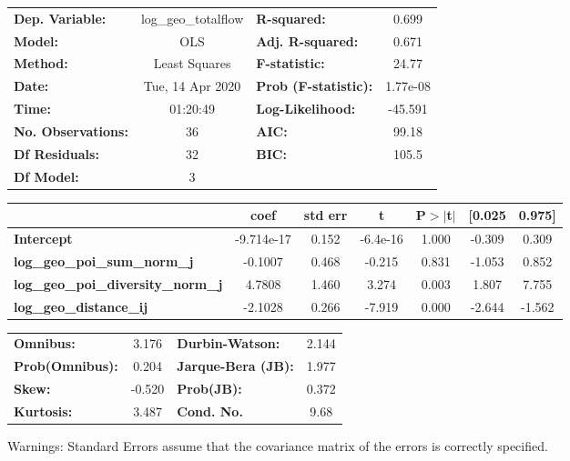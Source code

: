 \begin{center}
\begin{tabular}{lclc}
\toprule
\textbf{Dep. Variable:}                    & log\_geo\_totalflow & \textbf{  R-squared:         } &     0.699   \\
\textbf{Model:}                            &         OLS         & \textbf{  Adj. R-squared:    } &     0.671   \\
\textbf{Method:}                           &    Least Squares    & \textbf{  F-statistic:       } &     24.77   \\
\textbf{Date:}                             &   Tue, 14 Apr 2020  & \textbf{  Prob (F-statistic):} &  1.77e-08   \\
\textbf{Time:}                             &       01:20:49      & \textbf{  Log-Likelihood:    } &   -45.591   \\
\textbf{No. Observations:}                 &            36       & \textbf{  AIC:               } &     99.18   \\
\textbf{Df Residuals:}                     &            32       & \textbf{  BIC:               } &     105.5   \\
\textbf{Df Model:}                         &             3       & \textbf{                     } &             \\
\bottomrule
\end{tabular}
\begin{tabular}{lcccccc}
                                           & \textbf{coef} & \textbf{std err} & \textbf{t} & \textbf{P$> |$t$|$} & \textbf{[0.025} & \textbf{0.975]}  \\
\midrule
\textbf{Intercept}                         &   -9.714e-17  &        0.152     &  -6.4e-16  &         1.000        &       -0.309    &        0.309     \\
\textbf{log\_geo\_poi\_sum\_norm\_j}       &      -0.1007  &        0.468     &    -0.215  &         0.831        &       -1.053    &        0.852     \\
\textbf{log\_geo\_poi\_diversity\_norm\_j} &       4.7808  &        1.460     &     3.274  &         0.003        &        1.807    &        7.755     \\
\textbf{log\_geo\_distance\_ij}            &      -2.1028  &        0.266     &    -7.919  &         0.000        &       -2.644    &       -1.562     \\
\bottomrule
\end{tabular}
\begin{tabular}{lclc}
\textbf{Omnibus:}       &  3.176 & \textbf{  Durbin-Watson:     } &    2.144  \\
\textbf{Prob(Omnibus):} &  0.204 & \textbf{  Jarque-Bera (JB):  } &    1.977  \\
\textbf{Skew:}          & -0.520 & \textbf{  Prob(JB):          } &    0.372  \\
\textbf{Kurtosis:}      &  3.487 & \textbf{  Cond. No.          } &     9.68  \\
\bottomrule
\end{tabular}
\end{center}

Warnings: \newline
 [1] Standard Errors assume that the covariance matrix of the errors is correctly specified.